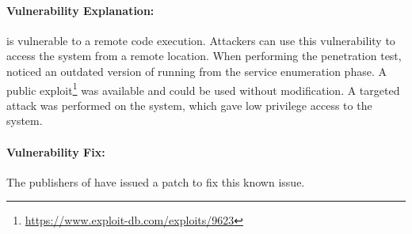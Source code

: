  
\paragraph{Vulnerability Explanation:}
\product{} is vulnerable to a remote code execution.
Attackers can use this vulnerability to access the system from a remote location.
When performing the penetration test, \name{} noticed an outdated version of \product{} running from the service enumeration phase. 
A public exploit\footnote{\url{https://www.exploit-db.com/exploits/9623}} was available and could be used without modification.
A targeted attack was performed on the system, which gave \name{} low privilege access to the system. 

\paragraph{Vulnerability Fix:}
The publishers of \product{} have issued a patch to fix this known issue.

